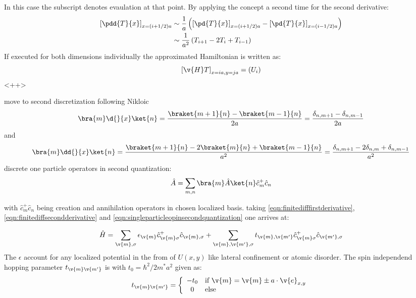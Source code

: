 In this case the subscript denotes evaulation at that point. By applying the concept a second time for the second derivative:
\begin{align}
  \left[\pdd{T}{x}\right]_{x=(i+1/2)a} &\sim \frac{1}{a}\left( \left[\pd{T}{x}\right]_{x=(i+1/2)a}-\left[\pd{T}{x}\right]_{x=(i-1/2)a} \right) \\
  &\sim \frac{1}{a^2}\left(T_{i+1}-2T_{i}+T_{i-1}\right)
  \label{ApproximateSecondDerivative}
\end{align}
If executed for both dimensions individually the approximated Hamiltonian is written as:
\begin{equation}
  \left[\v{H}T\right]_{x=ia,y=ja}= \left(U_{i}\right)
  \label{<++>}
\end{equation}<++>

move to second discretization following Nikloic
\begin{align}
	\bra{m} \d{}{x} \ket{n} = \frac{\braket{m+1}{n}-\braket{m-1}{n}}{2a} = \frac{\delta_{n,m+1}-\delta_{n,m-1}}{2a}
	\label{eqn:finitedifffirstderivative}
\end{align}
and
\begin{align}
	\bra{m} \dd{}{x} \ket{n} = \frac{\braket{m+1}{n}-2\braket{m}{n}+\braket{m-1}{n}}{a^2} = \frac{\delta_{n,m+1}-2\delta_{n,m}+\delta_{n,m-1}}{a^2}
	\label{eqn:finitediffsecondderivative}
\end{align}
discrete one particle operators in second quantization:
\begin{align}
	\hat{A} = \sum_{m,n} \bra{m}\hat{A}\ket{n} \hat{c}^+_m \hat{c}_n
 \label{eqn:singleparticleopinsecondquantization}
\end{align}

with $\hat{c}^+_m \hat{c}_n $ being creation and annihilation operators in chosen localized basis.
taking \ref{eqn:finitedifffirstderivative}, \ref{eqn:finitediffsecondderivative} and \ref{eqn:singleparticleopinsecondquantization} one arrives at:

\begin{align}
	\hat{H} = \sum_{\v{m},\sigma} \epsilon_{\v{m}} \hat{c}^+_{\v{m}\sigma} \hat{c}_{\v{m},\sigma} +
	\sum_{\v{m},\v{m'},\sigma} t_{\v{m},\v{m'}} \hat{c}^+_{\v{m}\sigma} \hat{c}_{\v{m'},\sigma}
	\label{eqn:discretizedeffectivemassHamil}
\end{align}
The $\epsilon$ account for any localized potential in the from of $U(x,y)$ like lateral confinement or atomic disorder.
The spin independend hopping parameter $t_{\v{m}\v{m'}}$ is with $t_0 = \hbar^2/2m^*a^2$  given as:
\begin{align}
t_{\v{m}\v{m'}} = \left\{ \begin{array}[c]{cl} -t_0 & \text{if } \v{m} = \v{m} \pm a \cdot \v{e}_{x,y} \\ 0 & \text{else} \end{array} \right.
	\label{eqn:t0hopping}
\end{align}

